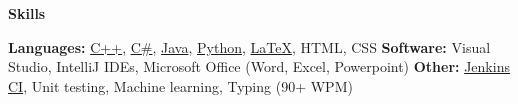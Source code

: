 \documentclass[letterpaper, 10pt]{article}
\newcommand{\resheading}[1]{
    \begin{mdframed}[
        backgroundcolor=black!15,
        linewidth=0.75pt,
        innertopmargin=4pt,
        innerbottommargin=4pt,
        skipabove=6pt,
        skipbelow=2pt]
        \textbf{\large #1}
    \end{mdframed}
}
\newcommand{\ressubheading}[4]{
    \textbf{#1} \hfill #2 \\[0pt]
    \textit{#3} \hfill #4 \\[0pt]
}
\begin{document}
\begin{NoHyper}








%
%


\resheading{Skills}
    
    
    
    
    
    
    
    
    


\textbf{Languages:}
    \href{https://en.wikipedia.org/wiki/C\%2B\%2B}{C++},
    \href{https://en.wikipedia.org/wiki/C_Sharp_(programming_language)}{C\#},
    \href{https://en.wikipedia.org/wiki/Java_(programming_language)}{Java},
    \href{https://www.python.org/}{Python},
    \href{https://www.latex-project.org/}{\LaTeX},
    HTML, CSS
\newline
\textbf{Software:}
    Visual Studio,
    IntelliJ IDEs,
    Microsoft Office (Word, Excel, Powerpoint)
\newline
\textbf{Other:}
    \href{https://jenkins.io/}{Jenkins CI},
    Unit testing,
    Machine learning,
    Typing (90+ WPM)









\end{NoHyper}
\end{document}
